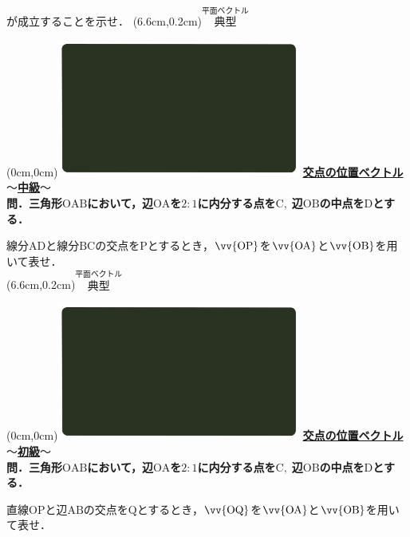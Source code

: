 \documentclass[10pt,
fleqn,
dvipdfmx,
uplatex
]{jsarticle}
\begin{document}
が成立することを示せ．
\at(6.6cm,0.2cm){\small\color{bradorange}$\overset{\text{平面ベクトル}}{\text{典型}}$}


\newpage



\at(0cm,0cm){\includegraphics[width=8cm,bb=0 0 1920 1080]{./media_local/smart_background/平面ベクトル.jpeg}}
{\color{orange}\bf\boldmath\Large\underline{交点の位置ベクトル$〜$中級$〜$}}\vspace{0.3zw}\\
\normalsize 
\bf\boldmath 問．三角形$\text{OAB}$において，辺$\text{OA}$を$2:1$に内分する点を$\text{C},\;$辺$\text{OB}$の中点を$\text{D}$とする．

\Large
線分$\text{AD}$と線分$\text{BC}$の交点を$\text{P}$とするとき，$\vv{\text{OP}}$を$\vv{\text{OA}}$と$\vv{\text{OB}}$を用いて表せ．\\

\at(6.6cm,0.2cm){\small\color{bradorange}$\overset{\text{平面ベクトル}}{\text{典型}}$}


\newpage



\at(0cm,0cm){\includegraphics[width=8cm,bb=0 0 1920 1080]{./media_local/smart_background/平面ベクトル.jpeg}}
{\color{orange}\bf\boldmath\Large\underline{交点の位置ベクトル$〜$初級$〜$}}\vspace{0.3zw}\\
\normalsize
\bf\boldmath 問．三角形$\text{OAB}$において，辺$\text{OA}$を$2:1$に内分する点を$\text{C},\;$辺$\text{OB}$の中点を$\text{D}$とする．

\Large
直線$\text{OP}$と辺$\text{AB}$の交点を$\text{Q}$とするとき，$\vv{\text{OQ}}$を$\vv{\text{OA}}$と$\vv{\text{OB}}$を用いて表せ．\\
\end{document}
